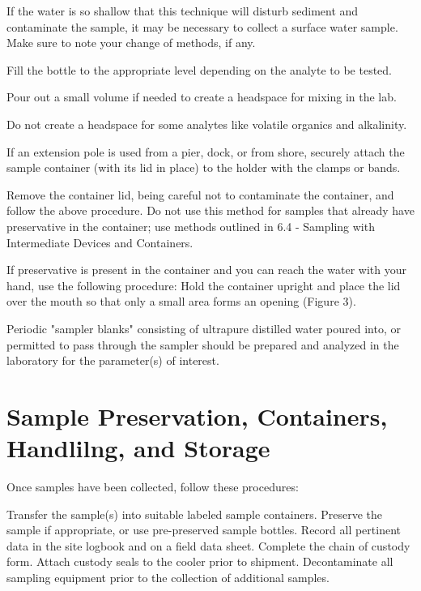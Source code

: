 \documentclass[12pt]{../SOP4_alpha}\usepackage[]{graphicx}\usepackage[]{xcolor}
\begin{document}
\NP If the water is so shallow that this technique will disturb sediment and contaminate the sample, it may be necessary to collect a surface water sample. Make sure to note your change of methods, if any.  

\NP Fill the bottle to the appropriate level depending on the analyte to be tested.  

\NP Pour out a small volume if needed to create a headspace for mixing in the lab. 

\NP Do not create a headspace for some analytes like volatile organics and alkalinity.  

\NP If an extension pole is used from a pier, dock, or from shore, securely attach the sample container (with its lid in place) to the holder with the clamps or bands. 

\NP Remove the container lid, being careful not to contaminate the container, and follow the above procedure. Do not use this method for samples that already have preservative in the container; use methods outlined in 6.4 - Sampling with Intermediate Devices and Containers.  

\NP If preservative is present in the container and you can reach the water with your hand, use the following procedure:  Hold the container upright and place the lid over the mouth so that only a small area forms an opening (Figure 3).

\NP Periodic "sampler blanks" consisting of ultrapure distilled water poured into, or permitted to pass through the sampler should be prepared and analyzed in the laboratory for the parameter(s) of interest.


\section{Sample Preservation, Containers, Handlilng, and Storage}\label{subsec:preservation}

Once samples have been collected, follow these procedures:

\NP Transfer the sample(s) into suitable labeled sample containers.
\NP Preserve the sample if appropriate, or use pre-preserved sample bottles.
\NP Record all pertinent data in the site logbook and on a field data sheet.
\NP Complete the chain of custody form.
\NP Attach custody seals to the cooler prior to shipment.
\NP Decontaminate all sampling equipment prior to the collection of additional
samples. 
\end{document}
